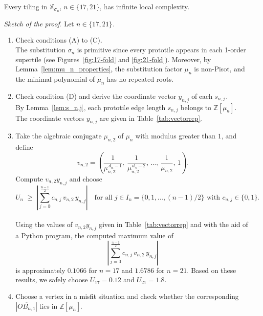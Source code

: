 \begin{thm}
Every tiling in $\mathbb{X}_{\sigma_{n}}$, $n \in \{17,21\}$, has infinite local complexity.
\end{thm}

\noindent\textit{Sketch of the proof.}
Let \( n \in \{17, 21\} \). 

\begin{enumerate}[leftmargin=20mm]
\item[Step 1.] Check conditions (A) to (C).\\[2mm]
The substitution \(\sigma_n\) is primitive since every prototile appears in each 1-order supertile (see Figures~\ref{fig:17-fold} and \ref{fig:21-fold}). Moreover, by Lemma~\ref{lem:mu_n_properties}, the substitution factor \(\mu_n\) is non-Pisot, and the minimal polynomial of \(\mu_n\) has no repeated roots.

\item[Step 2.] Check condition (D) and derive the coordinate vector $y_{n,j}$ of each $s_{n,j}$.\\[2mm]
By Lemma~\ref{lem:s_n,j}, each prototile edge length \(s_{n,j}\) belongs to \(\mathbb{Z}[\mu_n]\). The coordinate vectors $y_{n,j}$ are given in Table~\ref{tab:vectorrep}.\\

\item[Step 3.] Take the algebraic conjugate $\mu_{n,2}$ of $\mu_n$ with modulus greater than $1$, and define
\[
v_{n,2} =
\left( \frac{1}{\mu_{n,2}^{\,d_n - 1}},\,
       \frac{1}{\mu_{n,2}^{\,d_n - 2}},\,
       \ldots,\,
       \frac{1}{\mu_{n,2}},\,
       1 \right).
\]
Compute $v_{n,2}y_{n,j}$ and choose
\[
U_n \;\ge\; \left| \sum_{j=0}^{\frac{n-1}{2}} c_{n,j}\, v_{n,2}\, y_{n,j} \right|
\quad \text{for all } j \in I_n = \{0,1,\ldots,(n-1)/2\} \text{ with } c_{n,j} \in \{0,1\}.
\]\\[2mm]

Using the values of $v_{n,2}y_{n,j}$ given in Table~\ref{tab:vectorrep} and with the aid of a Python program, the computed maximum value of
\[
\left| \sum_{j=0}^{\frac{n-1}{2}} c_{n,j}\, v_{n,2}\, y_{n,j} \right|
\]
is approximately \(0.1066\) for \(n=17\) and \(1.6786\) for \(n=21\). Based on these results, we safely choose \(U_{17} = 0.12\) and \(U_{21} = 1.8\).\\

\item[Step 4.] Choose a vertex in a misfit situation and check whether the corresponding $|\overline{OB_{n,1}}|$ lies in \(\mathbb{Z}[\mu_n]\).\\


\end{enumerate}
